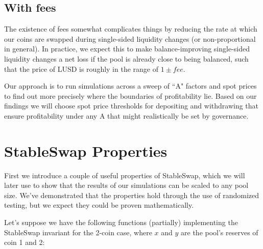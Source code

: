 \documentclass{article}
\begin{document}
\subsection{With fees}

The existence of fees somewhat complicates things by reducing the rate at which our coins are swapped during single-sided liquidity changes (or non-proportional in general). In practice, we expect this to make balance-improving single-sided liquidity changes a net loss if the pool is already close to being balanced, such that the price of LUSD is roughly in the range of $1 \pm fee$.

Our approach is to run simulations across a sweep of ``A" factors and spot prices to find out more precisely where the boundaries of profitability lie. Based on our findings we will choose spot price thresholds for depositing and withdrawing that ensure profitability under any A that might realistically be set by governance.

\section{StableSwap Properties}

First we introduce a couple of useful properties of StableSwap, which we will later use to show that the results of our simulations can be scaled to any pool size. We've demonstrated that the properties hold through the use of randomized testing, but we expect they could be proven mathematically.

Let's suppose we have the following functions (partially) implementing the StableSwap invariant for the 2-coin case, where $x$ and $y$ are the pool's reserves of coin 1 and 2:
\end{document}
